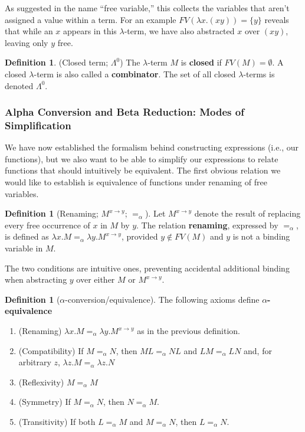 \documentclass{article}
\theoremstyle{definition}
\newtheorem{definition} [theorem] {Definition}
\newcommand{\1}{\mathbb{1}}
\newcommand{\0}{\mathbb{0}}
\begin{document}
As suggested in the name \enquote{free variable,} this collects the variables that aren't assigned a value within a term. For an example $FV(\lambda x. (xy)) = \{y\}$ reveals that while an $x$ appears in this $\lambda$-term, we have also abstracted $x$ over $(xy)$, leaving only $y$ free. 

\begin{definition}(Closed term; $\Lambda^0$)
    The $\lambda$-term $M$ is \textbf{closed} if $FV(M) = \emptyset$. A closed $\lambda$-term is also called a \textbf{combinator}. The set of all closed $\lambda$-terms is denoted $\Lambda^0$. 
\end{definition}

\subsubsection{Alpha Conversion and Beta Reduction: Modes of Simplification}

We have now established the formalism behind constructing expressions (i.e., our functions), but we also want to be able to simplify our expressions to relate functions that should intuitively be equivalent. The first obvious relation we would like to establish is equivalence of functions under renaming of free variables. 

\begin{definition}[Renaming; $M^{x \to y}$; $=_\alpha$]
    Let $M^{x \to y}$ denote the result of replacing every free occurrence of $x$ in $M$ by $y$. The relation \textbf{renaming}, expressed by $=_\alpha$, is defined as $\lambda x. M =_\alpha \lambda y. M^{x \to y}$, provided $y \notin FV(M)$ and $y$ is not a binding variable in $M$. 
\end{definition}

The two conditions are intuitive ones, preventing accidental additional binding when abstracting $y$ over either $M$ or $M^{x \to y}$. 

\begin{definition}[$\alpha$-conversion/equivalence] The following axioms define \textbf{$\alpha$-equivalence}
    \begin{enumerate}
        \item (Renaming) $\lambda x. M =_\alpha \lambda y. M^{x \to y}$ as in the previous definition. 
        \item (Compatibility) If $M =_\alpha N$, then $ML =_\alpha NL$ and $LM =_\alpha LN$ and, for arbitrary $z$, $\lambda z. M =_\alpha \lambda z.N$
        \item (Reflexivity) $M =_\alpha M$ 
        \item (Symmetry) If $M =_\alpha N$, then $N =_\alpha M$. 
        \item (Transitivity) If both $L =_\alpha M$ and $M =_\alpha N$, then $L =_\alpha N$. 
    \end{enumerate}
\end{definition}
\end{document}
